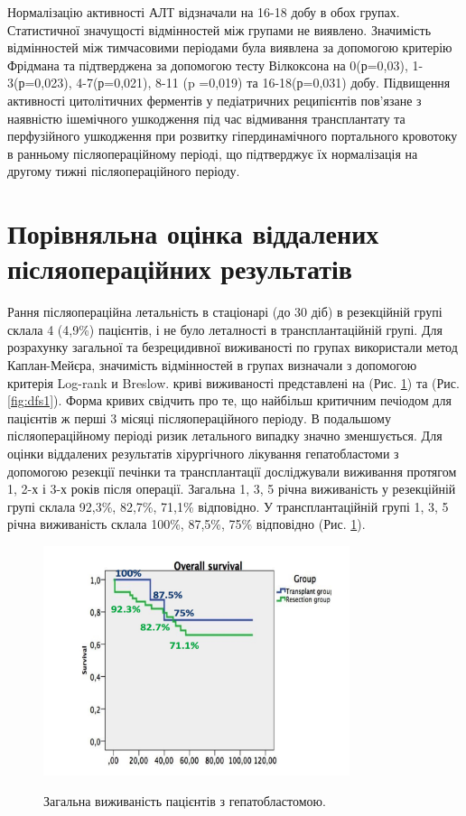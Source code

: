 Нормалізацію активності АЛТ відзначали на 16-18 добу в обох групах. Статистичної значущості відмінностей між групами не виявлено. Значимість відмінностей між тимчасовими періодами була виявлена за допомогою критерію Фрідмана та підтверджена за допомогою тесту Вілкоксона на 0(р=0,03), 1-3(р=0,023), 4-7(р=0,021), 8-11 (p =0,019) та 16-18(р=0,031) добу.
Підвищення активності цитолітичних ферментів у педіатричних реципієнтів пов'язане з наявністю ішемічного ушкодження під час відмивання трансплантату та перфузійного ушкодження при розвитку гіпердинамічного портального кровотоку в ранньому післяопераційному періоді, що підтверджує їх нормалізація на другому тижні післяопераційного періоду.




\section{Порівняльна оцінка віддалених післяопераційних результатів}

Рання післяопераційна летальність в стаціонарі (до 30 діб) в резекційній групі склала 4 (4,9\%) пацієнтів, і не було леталності в трансплантаційній групі. 
Для розрахунку загальної та безрецидивної виживаності по групах використали метод Каплан-Мейєра, значимість відмінностей в групах визначали з допомогою критерія Log-rank и Breslow. криві виживаності представлені на (Рис. \ref{fig:os1}) та (Рис. \ref{fig:dfs1}). Форма кривих свідчить про те, що найбільш критичним печіодом для пацієнтів ж перші 3 місяці післяопераційного періоду. В подальшому післяопераційному періоді ризик летального випадку значно зменшується. 
Для оцінки віддалених результатів хірургічного лікування гепатобластоми з допомогою резекції печінки та трансплантації досліджували виживання протягом 1, 2-х і 3-х років після операції. Загальна 1, 3, 5 річна виживаність у резекційній групі склала 92,3\%, 82,7\%, 71,1\% відповідно. У трансплантаційній групі 1, 3, 5 річна виживаність склала 100\%, 87,5\%, 75\% відповідно (Рис. \ref{fig:os1}).

\begin{figure}[h]
\caption{Загальна виживаність пацієнтів з гепатобластомою.}
\centering
\includegraphics[width=0.8\textwidth]{Illustrations/os1.jpg}
\label{fig:os1} 
\end{figure}


